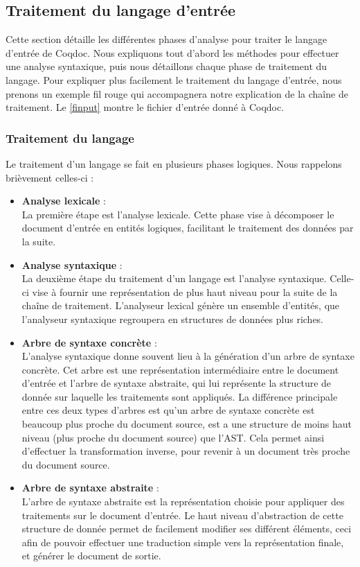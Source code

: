 \documentclass[a4paper, 11pt]{report}
\begin{document}
    \subsection{Traitement du langage d'entrée}
    Cette section détaille les différentes phases d'analyse pour traiter le
    langage d'entrée de Coqdoc. Nous expliquons tout d'abord les méthodes
    pour effectuer une analyse syntaxique, puis nous détaillons chaque phase
    de traitement du langage.
    Pour expliquer plus facilement le traitement du langage d'entrée, nous
    prenons un exemple fil rouge qui accompagnera notre explication de la
    chaîne de traitement. Le \cref{finput} montre le fichier d'entrée
    donné à Coqdoc.
    

    \subsubsection{Traitement du langage}
    \label{trait}
    Le traitement d'un langage se fait en plusieurs phases logiques. Nous
    rappelons brièvement celles-ci :
    \begin{itemize}
    \item[] \textbf{Analyse lexicale}  :\\
      La première étape est l'analyse lexicale. Cette phase vise à décomposer
      le document d'entrée en entités logiques, facilitant le traitement
      des données par la suite.
    \item[] \textbf{Analyse syntaxique} :\\
      La deuxième étape du traitement d'un langage est l'analyse syntaxique.
      Celle-ci vise à fournir une représentation de plus haut niveau pour
      la suite de la chaîne de traitement. L'analyseur lexical génère un
      ensemble d'entités, que l'analyseur syntaxique regroupera en structures
      de données plus riches.
      \item[] \textbf{Arbre de syntaxe concrète} :\\
      L'analyse syntaxique donne souvent lieu à la génération d'un arbre
      de syntaxe concrète. Cet arbre est une représentation intermédiaire
      entre le document d'entrée et l'arbre de syntaxe abstraite, qui
      lui représente la structure de donnée sur laquelle les traitements sont
      appliqués. La différence principale entre ces deux types d'arbres est
      qu'un arbre de syntaxe concrète est beaucoup plus proche du document
      source, est a une structure de moins haut niveau (plus proche du
      document source) que l'AST.  Cela permet ainsi d'effectuer la
      transformation inverse, pour revenir à un document très proche du
      document source.
      \item[] \textbf{Arbre de syntaxe abstraite} :\\
      L'arbre de syntaxe abstraite est la représentation choisie pour appliquer
      des traitements sur le document d'entrée. Le haut niveau d'abstraction
      de cette structure de donnée permet de facilement modifier ses différent
      éléments, ceci afin de pouvoir effectuer une traduction simple vers la
      représentation finale, et générer le document de sortie.
    \end{itemize}
\end{document}
